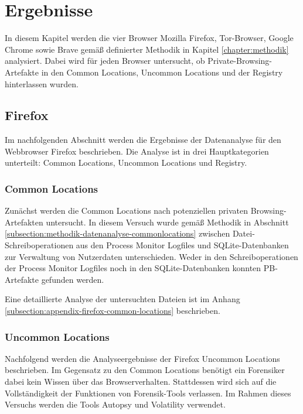 \chapter{Ergebnisse}
\label{chapter:ergebnisse}

In diesem Kapitel werden die vier Browser Mozilla Firefox, Tor-Browser, Google Chrome sowie Brave gemäß definierter Methodik in Kapitel \ref{chapter:methodik} analysiert. Dabei wird für jeden Browser untersucht, ob Private-Browsing-Artefakte in den Common Locations, Uncommon Locations und der Registry hinterlassen wurden. 


\section{Firefox}
\label{section:ergebnisse-firefox}
Im nachfolgenden Abschnitt werden die Ergebnisse der Datenanalyse für den Webbrowser Firefox beschrieben. Die Analyse ist in drei Hauptkategorien unterteilt: Common Locations, Uncommon Locations und Registry.

\subsection*{Common Locations}
\label{subsection:ergebnisse-firefox-commonlocations}
Zunächst werden die Common Locations nach potenziellen privaten Browsing-Artefakten untersucht. In diesem Versuch wurde gemäß Methodik in Abschnitt \ref{subsection:methodik-datenanalyse-commonlocations} zwischen Datei-Schreiboperationen aus den Process Monitor Logfiles und SQLite-Datenbanken zur Verwaltung von Nutzerdaten unterschieden. Weder in den Schreiboperationen der Process Monitor Logfiles noch in den SQLite-Datenbanken konnten PB-Artefakte gefunden werden. 

Eine detaillierte Analyse der untersuchten Dateien ist im Anhang \ref{subsection:appendix-firefox-common-locations} beschrieben.

\subsection*{Uncommon Locations}
\label{subsection:ergebnisse-firefox-uncommonlocations}
Nachfolgend werden die Analyseergebnisse der Firefox Uncommon Locations beschrieben.
Im Gegensatz zu den Common Locations benötigt ein Forensiker dabei kein Wissen über das Browserverhalten. Stattdessen wird sich auf die Vollständigkeit der Funktionen von Forensik-Tools verlassen. Im Rahmen dieses Versuchs werden die Tools Autopsy und Volatility verwendet.

